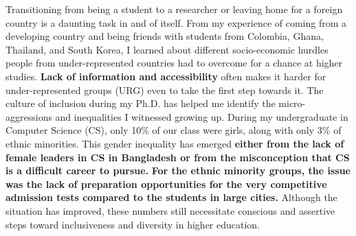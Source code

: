 \documentclass[10pt]{article}
\begin{document}
 Transitioning from being a student to a researcher or leaving home for a foreign country is a daunting task in and of itself.
From my experience of coming from a developing country
and being friends with students from Colombia, Ghana, Thailand, and South Korea, I learned about different socio-economic hurdles people from under-represented countries had to overcome for a chance at higher studies. \textbf{Lack of information and accessibility} often makes it harder for under-represented groups (URG) even to take the first step towards it.
%
%
The culture of inclusion during my Ph.D. has helped me identify the micro-aggressions and inequalities I witnessed growing up.
%
During my undergraduate in Computer Science (CS), only 10\% of our class were girls, %
along with only 3\% of ethnic minorities. 
This gender inequality has emerged \textbf{either from the lack of female leaders in CS in Bangladesh or from the misconception that CS is a difficult career to pursue.} 
\textbf{For the ethnic minority groups, the issue was the lack of preparation opportunities for the very competitive admission tests compared to the students in large cities.}
Although the situation has improved, these numbers still necessitate conscious and assertive steps toward inclusiveness and diversity in higher education. 

\end{document}

